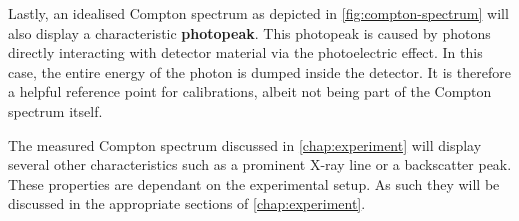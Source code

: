 Lastly, an idealised Compton spectrum as depicted in \autoref{fig:compton-spectrum}
will also display a characteristic \textbf{photopeak}. This photopeak is caused by
photons directly interacting with detector material via the photoelectric effect.
In this case, the entire energy of the photon is dumped inside the detector. It is
therefore a helpful reference point for calibrations, albeit not being part of the
Compton spectrum itself.

The measured Compton spectrum discussed in \autoref{chap:experiment} will display
several other characteristics such as a prominent X-ray line or a backscatter peak.
These properties are dependant on the experimental setup. As such they will be
discussed in the appropriate sections of \autoref{chap:experiment}.

